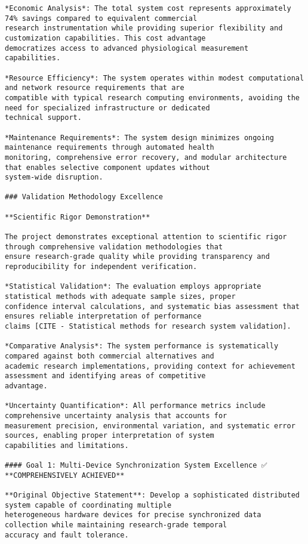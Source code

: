 \documentclass[12pt,a4paper]{report}
\begin{document}
\begin{verbatim}
*Economic Analysis*: The total system cost represents approximately 74% savings compared to equivalent commercial
research instrumentation while providing superior flexibility and customization capabilities. This cost advantage
democratizes access to advanced physiological measurement capabilities.

*Resource Efficiency*: The system operates within modest computational and network resource requirements that are
compatible with typical research computing environments, avoiding the need for specialized infrastructure or dedicated
technical support.

*Maintenance Requirements*: The system design minimizes ongoing maintenance requirements through automated health
monitoring, comprehensive error recovery, and modular architecture that enables selective component updates without
system-wide disruption.

### Validation Methodology Excellence

**Scientific Rigor Demonstration**

The project demonstrates exceptional attention to scientific rigor through comprehensive validation methodologies that
ensure research-grade quality while providing transparency and reproducibility for independent verification.

*Statistical Validation*: The evaluation employs appropriate statistical methods with adequate sample sizes, proper
confidence interval calculations, and systematic bias assessment that ensures reliable interpretation of performance
claims [CITE - Statistical methods for research system validation].

*Comparative Analysis*: The system performance is systematically compared against both commercial alternatives and
academic research implementations, providing context for achievement assessment and identifying areas of competitive
advantage.

*Uncertainty Quantification*: All performance metrics include comprehensive uncertainty analysis that accounts for
measurement precision, environmental variation, and systematic error sources, enabling proper interpretation of system
capabilities and limitations.

#### Goal 1: Multi-Device Synchronization System Excellence ✅ **COMPREHENSIVELY ACHIEVED**

**Original Objective Statement**: Develop a sophisticated distributed system capable of coordinating multiple
heterogeneous hardware devices for precise synchronized data collection while maintaining research-grade temporal
accuracy and fault tolerance.


\end{verbatim}
\end{document}
